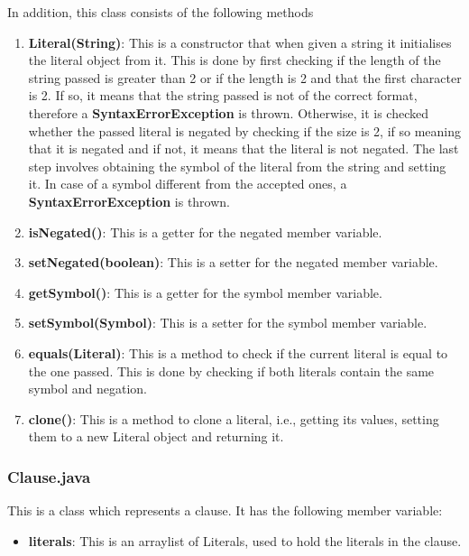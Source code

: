 \documentclass{article}
\begin{document}
		In addition, this class consists of the following methods
		
		\begin{enumerate}
		\item \textbf{Literal(String)}: This is a constructor that when given a string it initialises the literal object from it. This is done by first checking if the length of the string passed is greater than 2 or if the length is 2 and that the first character is 2. If so, it means that the string passed is not of the correct format, therefore a \textbf{SyntaxErrorException} is thrown. Otherwise, it is checked whether the passed literal is negated by checking if the size is 2, if so meaning that it is negated and if not, it means that the literal is not negated. The last step involves obtaining the symbol of the literal from the string and setting it. In case of a symbol different from the accepted ones, a \textbf{SyntaxErrorException} is thrown.
		
		\item \textbf{isNegated()}: This is a getter for the negated member variable.
		\item \textbf{setNegated(boolean)}: This is a setter for the negated member variable.		
		\item \textbf{getSymbol()}: This is a getter for the symbol member variable.
		\item \textbf{setSymbol(Symbol)}: This is a setter for the symbol member variable.	
		\item \textbf{equals(Literal)}: This is a method to check if the current literal is equal to the one passed. This is done by checking if both literals contain the same symbol and negation.
		\item \textbf{clone()}: This is a method to clone a literal, i.e., getting its values, setting them to a new Literal object and returning it.
		
		\end{enumerate}
		
		\subsubsection{Clause.java}
		
		This is a class which represents a clause. It has the following member variable:
		\begin{itemize}
		\item \textbf{literals}: This is an arraylist of Literals, used to hold the literals in the clause.
		\end{itemize}
		
\end{document}
